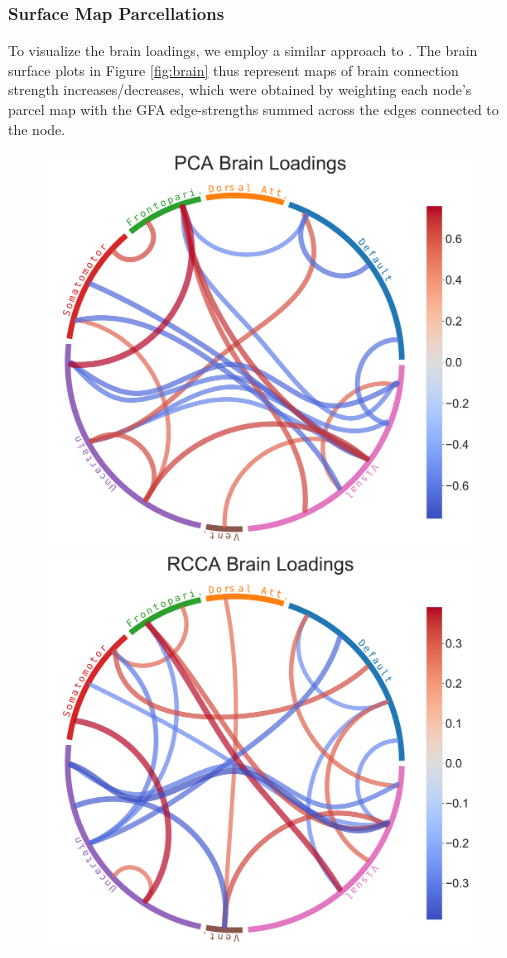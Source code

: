 \subsubsection{Surface Map Parcellations}
To visualize the brain loadings, we employ a similar approach to \citep{ferreira2022hierarchical, smith2015positive}.
The brain surface plots in Figure \ref{fig:brain} thus represent maps of brain connection strength increases/decreases, which
were obtained by weighting each node’s parcel map with the GFA edge-strengths summed across the edges
connected to the node.


\begin{figure}
\centering
\includegraphics[width=0.72\linewidth]{figures/regularization/hcp/PCA brain loadings.pdf}
\includegraphics[width=0.72\linewidth]{figures/regularization/hcp/RCCA brain loadings.pdf}

\end{figure}
